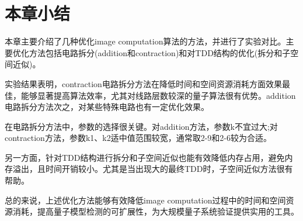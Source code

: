 

\section{本章小结}
本章主要介绍了几种优化image computation算法的方法，并进行了实验对比。主要优化方法包括电路拆分(addition和contraction)和对TDD结构的优化(拆分和子空间近似)。

实验结果表明，contraction电路拆分方法在降低时间和空间资源消耗方面效果最佳，能够显著提高算法效率，尤其对线路层数较深的量子算法很有优势。addition电路拆分方法次之，对某些特殊电路也有一定优化效果。

在电路拆分方法中，参数的选择很关键。对addition方法，参数k不宜过大;对contraction方法，参数k1、k2适中值范围较宽，通常取2-9和2-6较为合适。

另一方面，针对TDD结构进行拆分和子空间近似也能有效降低内存占用，避免内存溢出，且时间开销较小。尤其是当出现大的最终TDD时，子空间近似方法很有帮助。

总的来说，上述优化方法能够有效降低image computation过程中的时间和空间资源消耗，提高量子模型检测的可扩展性，为大规模量子系统验证提供实用的工具。